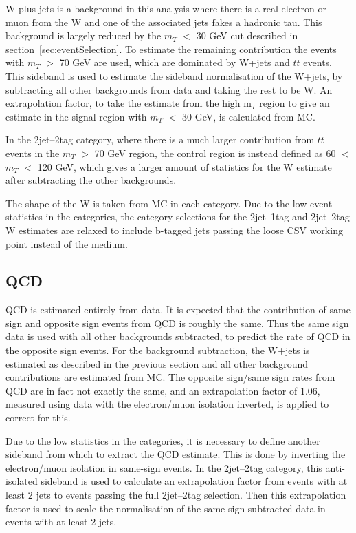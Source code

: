 W plus jets is a background in this analysis where there is a real electron or
muon from the W and one of the associated jets fakes a hadronic tau. This
background is largely reduced by the $m_{T}$ $<$ 30 GeV cut described in
section~\ref{sec:eventSelection}. To estimate the remaining contribution the
events with $m_{T}$ $>$ 70 GeV are used, which are dominated by W+jets and $t
\bar{t}$
events. This sideband is used to estimate the sideband normalisation of the W+jets, by
subtracting all other backgrounds from data and taking the rest to be W.
An extrapolation factor, to take the estimate from the high m$_{T}$ region to
give an estimate in the signal region with $m_{T}$ $<$ 30 GeV, is calculated from MC.

In the 2jet--2tag category, where there is a much larger contribution from $t
\bar{t}$ events in the $m_{T}$ $>$ 70 GeV region, the control region is instead
defined as 60 $<$ $m_{T}$ $<$ 120 GeV, which gives a larger amount of statistics for
the W estimate after subtracting the other backgrounds.

The shape of the W is taken from MC in each category. Due to the low event statistics in the
categories, the category selections for the 2jet--1tag and 2jet--2tag W
estimates are relaxed to include b-tagged jets passing the loose CSV working point 
instead of the medium.

\subsection{QCD}
\label{sec:backgroundEstimation_QCD}

QCD is estimated entirely from data. It is expected that the contribution of
same sign and opposite sign events from QCD is roughly the same. Thus the same
sign data is used with all other backgrounds subtracted, to predict the rate of
QCD in the opposite sign events. For the background subtraction, the W+jets is
estimated as described in the previous section and all other background
contributions are estimated from MC. The opposite sign/same sign rates from QCD
are in fact not exactly the same, and an extrapolation factor of 1.06, measured
using data with the electron/muon isolation inverted, is applied to correct for
this.

Due to the low statistics in the categories, it is necessary to define another
sideband from which to extract the QCD estimate. This is done by inverting the
electron/muon isolation in same-sign events. In the 2jet--2tag category, this
anti-isolated sideband is used to calculate an extrapolation factor from events
with at least 2 jets to events passing the full 2jet--2tag selection. Then this
extrapolation factor is used to scale the normalisation of the same-sign
subtracted data in events with at least 2 jets.

